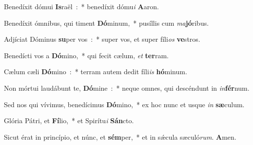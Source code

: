 \item Benedíxit dómui \textbf{Is}\-raël~:~* benedíxit dómu\emph{i} \textbf{A}aron.
\item Benedíxit ómnibus, qui timent \textbf{Dó}\-minum,~* pusíllis cum \emph{ma}\textbf{jó}ribus.
\item Adjíciat Dóminus \textbf{su}\-per vos~:~* super vos, et super fíli\emph{os} \textbf{ve}stros.
\item Benedícti vos a \textbf{Dó}\-mino,~* qui fecit cælum, \emph{et} \textbf{ter}ram.
\item Cælum cæli \textbf{Dó}\-mino~:~* terram autem dedit fíli\emph{is} \textbf{hó}minum.
\item Non mórtui laudábunt te, \textbf{Dó}\-mine~:~* neque omnes, qui descéndunt in \emph{in}\textbf{fér}num.
\item Sed nos qui vívimus, benedícimus \textbf{Dó}\-mino,~* ex hoc nunc et usque \emph{in} \textbf{sæ}culum.
\item Glória Pátri, et \textbf{Fí}\-lio,~* et Spirítu\emph{i} \textbf{Sán}cto.
\item Sicut érat in princípio, et núnc, et \textbf{sém}\-per,~* et in sǽcula sæculó\emph{rum}. \textbf{A}men.